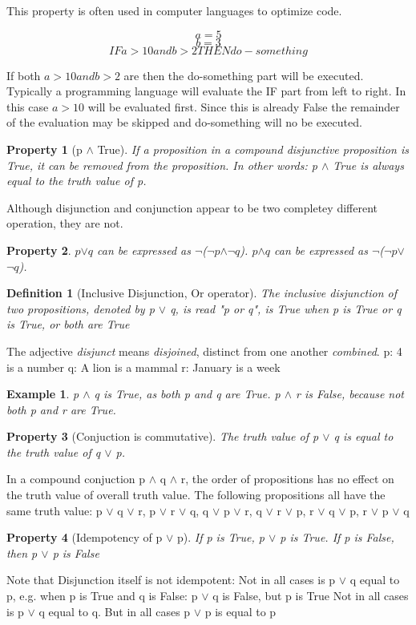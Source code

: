 \documentclass[10pt,a4paper,draft,titlepage,onecolumn]{book}
\newtheorem{definition}{Definition}[section]
\newtheorem{example}{Example}[section]
\newtheorem{property}{Property}[section]
\begin{document}
This property is often used in computer languages to optimize code.

$$a = 5$$
$$b = 3$$
$$IF  a > 10  and b > 2 THEN do-something$$
		
If both $a > 10  and  b > 2$ are then the do-something part will be executed. 
Typically a programming language will evaluate the IF part from left to right. 
In this case $a > 10$ will be evaluated first. Since this is already False the remainder of the evaluation may be skipped and do-something will no be executed.

\begin{property}[p $\wedge$  True]  If a proposition in a compound disjunctive proposition is True, it can be removed from the proposition. In other words: p $\wedge$  True is always equal to the truth value of p.
\end{property}

Although disjunction and conjunction appear to be two completey different operation, they are not. 
\begin{property}
$p${$\vee$}$q$ can be expressed as {$\neg$}({$\neg$}$p${$\wedge$}{$\neg$}$q$). 
$p${$\wedge$}$q$ can be expressed as {$\neg$}({$\neg$}$p${$\vee$}{$\neg$}$q$).

\end{property}



\begin{definition}[Inclusive Disjunction, Or operator] The inclusive disjunction of two propositions, denoted by p $\vee$ q, is read "p or q", is True when p is True or q is True, or both are True
\end{definition} 
The adjective \textit{disjunct} means \textit{disjoined}, {distinct from one another} \textit{combined}.
p: 4 is a number
q: A lion is a mammal 
r: January is a week


\begin{example}
p $\wedge$ q is True, as both p and q are True.
p $\wedge$ r is False, because not both p and r are True.
\end{example}

\begin{property}[Conjuction is commutative] The truth value of p $\vee$  q is equal to the truth value of q $\vee$ p.
\end{property}
In a compound conjuction p $\wedge$ q $\wedge$ r, the order of propositions has no effect on the truth value of overall truth value. The following propositions all have the same truth value:
p $\vee$ q $\vee$ r,
p $\vee$ r $\vee$ q,
q $\vee$ p $\vee$ r,
q $\vee$ r $\vee$ p,
r $\vee$ q $\vee$ p,
r $\vee$ p $\vee$ q
\begin{property}[Idempotency of p $\vee$  p] If p is True, p $\vee$ p is True. If p is False, then p $\vee$ p is False
\end{property}
Note that Disjunction itself is not idempotent: 
Not in all cases is  p $\vee$ q equal to p, e.g. when p is True and q is False: p $\vee$ q is False, but p is True
Not in all cases is  p $\vee$ q equal to q. 
But in all cases   p $\vee$ p is equal to p 
\end{document}
